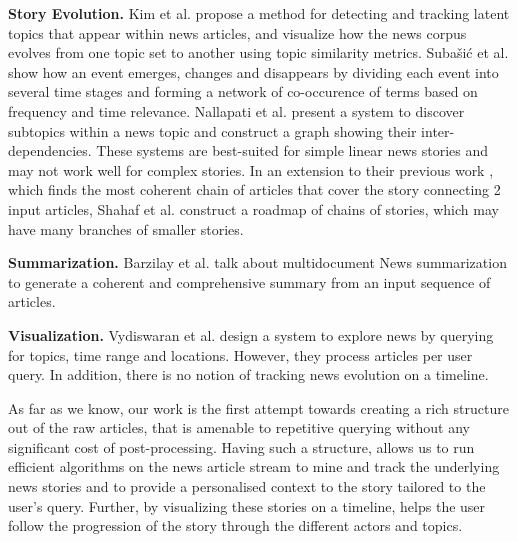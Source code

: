 \textbf{Story Evolution.}  Kim et al.\cite{Kim:2011:TCU:1964750.1964765} propose a method for detecting and tracking latent topics that appear within news articles, and visualize how the news corpus evolves from one topic set to another using topic similarity metrics. Suba\v{s}i\'{c} et al.\cite{subasic-ida:2013} %
 show how an event emerges, changes and disappears by dividing each event into several time stages and forming a network of co-occurence of terms based on frequency and time relevance. Nallapati et al.\cite
{Nallapati:2004:ETW:1031171.1031258, Mei:2005:DET:1081870.1081895} present a system to discover subtopics within a news topic and construct a graph showing their inter-dependencies. These systems are best-suited for simple linear news stories and may not work well for complex stories. In an extension to their previous work \cite{shahaf@kdd2010}, which finds the most coherent chain of articles that cover the story connecting 2 input articles, Shahaf et al.\cite{shahaf@www2012} construct a roadmap of chains of stories, which may have many branches of smaller stories. 

\textbf{Summarization.} Barzilay et al.\cite{Barzilay:2002:ISS:1622810.1622812} talk about multidocument News summarization to generate a coherent and comprehensive summary from an input sequence of articles.

\textbf{Visualization.} Vydiswaran et al.\cite{MEET:MEET14504801078} design a system to explore news by querying for topics, time range and locations. However, they process articles per user query. In addition, there is no notion of tracking news evolution on a timeline.

As far as we know, our work is the first attempt towards creating a rich structure out of the raw articles, that is amenable to repetitive querying without any significant cost of post-processing. Having such a structure, allows us to run efficient algorithms on the news article stream to mine and track the underlying news stories and to provide a personalised context to the story tailored to the user's query. Further, by visualizing these stories on a timeline, helps the user follow the progression of the story through the different actors and topics.
